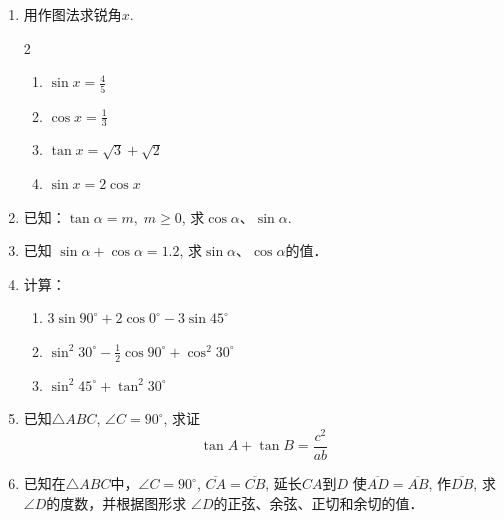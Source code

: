 \begin{enumerate}
    \item 用作图法求锐角$x$.
\begin{multicols}{2}
    \begin{enumerate}
        \item $\sin x=\frac{4}{5}$
        \item $\cos x=\frac{1}{3}$
        \item $\tan x=\sqrt{3}+\sqrt{2}$
        \item $\sin x=2\cos x$
    \end{enumerate}
\end{multicols}

\item 已知：$\tan\alpha=m,\; m\ge 0$, 求$\cos\alpha$、$\sin\alpha$.
\item 已知
   $ \sin\alpha+\cos\alpha=1.2$, 求$\sin\alpha$、$\cos\alpha$的值．
    \item 计算：
\begin{enumerate}
    \item $3\sin90^{\circ}+2\cos0^{\circ}-3\sin45^{\circ}$
    \item $\sin^2 30^{\circ}-\frac{1}{2}\cos 90^{\circ}+\cos^2 30^{\circ}$
    \item $\sin^2 45^{\circ}+\tan^2 30^{\circ}$
\end{enumerate}

    \item 已知$\triangle ABC$, $\angle C=90^{\circ}$, 求证
  \[  \tan A+\tan B=\frac{c^2}{ab}\]
    \item 已知在$\triangle ABC$中，$\angle C=90^{\circ}$, $\overline{CA}=\overline{CB}$, 延长$CA$到$D$
    使$\overline{AD}=\overline{AB}$, 作$\overline{DB}$, 求$\angle D$的度数，并根据图形求
    $\angle D$的正弦、余弦、正切和余切的值．


\end{enumerate}
